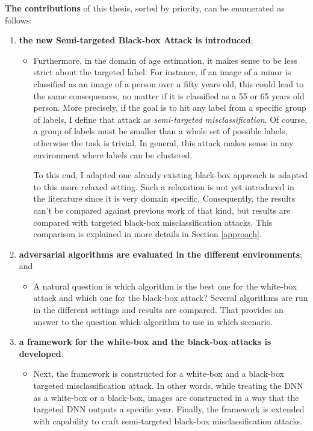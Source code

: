 \textbf{The contributions} of this thesis, sorted by priority, can be enumerated as follows:
\begin{enumerate}

\item \textbf{the new Semi-targeted Black-box Attack is introduced};
	\begin{itemize}
	\item Furthermore, in the domain of age estimation, it makes sense to be less strict about the targeted label. For instance, if an image of a minor is classified as an image of a person over a fifty years old, this could lead to the same consequences, no matter if it is classified as a 55 or 65 years old person. More precisely, if the goal is to hit any label from a specific group of labels, I define that attack as \textit{semi-targeted misclassification}. Of course, a group of labels must be smaller than a whole set of possible labels, otherwise the task is trivial. In general, this attack makes sense in any environment where labels can be clustered.

To this end, I adapted one already existing black-box approach is adapted to this more relaxed setting. Such a relaxation is not yet introduced in the literature since it is very domain specific. Consequently, the results can't be compared against previous work of that kind, but results are compared with targeted black-box misclassification attacks. This comparison is explained in more details in Section \ref{approach}. 
	\end{itemize}
	
\item \textbf{adversarial algorithms are evaluated in the different environments}; and
	\begin{itemize}
		\item A natural question is which algorithm is the best one for the white-box attack and which one for the black-box attack? Several algorithms are run in the different settings and results are compared. That provides an answer to the question which algorithm to use in which scenario.
	\end{itemize}

\item \textbf{a framework for the white-box and the black-box attacks is developed}.
	\begin{itemize}
	\item Next, the framework is constructed for a white-box and a black-box targeted misclassification attack. In other words, while treating the DNN as a white-box or a black-box, images  are constructed in a way that the targeted DNN outputs a specific year. Finally, the framework is extended with capability to craft semi-targeted black-box misclassification attacks.
	\end{itemize}
\end{enumerate}

